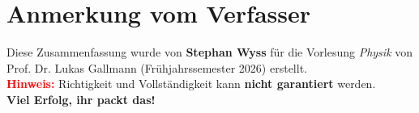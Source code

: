 \section{Anmerkung vom Verfasser}

Diese Zusammenfassung wurde von \textbf{Stephan Wyss} für die Vorlesung \textit{Physik} von Prof. Dr. Lukas Gallmann (Frühjahrssemester 2026) erstellt. \\[1ex]

\textbf{\textcolor{red}{Hinweis:}} Richtigkeit und Vollständigkeit kann \textbf{nicht garantiert} werden. \\[2ex]

\textbf{Viel Erfolg, ihr packt das!}

\vspace{3mm}